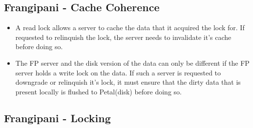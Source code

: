 \documentclass[parskip=half]{scrartcl}
\begin{document}

    \subsection{Frangipani - Cache Coherence} %
    \label{sub:frangipani_cache_coherence}

        \begin{itemize}
            \item 
            A read lock allows a server to cache the data that it acquired the lock for. If requested to relinquish the lock, the server needs to invalidate it's cache before doing so.
            \item 
            The FP server and the disk version of the data can only be different if the FP server holds a write lock on the data. If such a server is requested to downgrade or relinquish it's lock, it must ensure that the dirty data that is present locally is flushed to Petal(disk) before doing so.
        \end{itemize}
    

    \subsection{Frangipani - Locking} %
    \label{sub:frangipani_locking}
\end{document}
